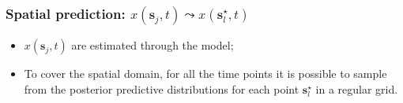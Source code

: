 \documentclass[slidestop,compress,serif,10pt]{beamer}
\begin{document}
\begin{frame}
\frametitle{Spatial prediction: $x(\bm s_{j},t) \leadsto x(\bm s_l^\star,t)$}
\begin{itemize}
\item  $x(\bm s_{j},t)$ are estimated through the model; 
\item To cover the spatial domain, for all the time points it is possible to sample from the posterior predictive distributions for each point $\bm s_l^\star$ in a regular grid. 
\end{itemize}

\begin{center}
\end{center}
\end{frame}
\end{document}
